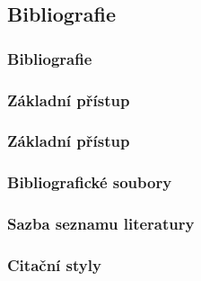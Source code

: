 \subsection{Bibliografie}
\begin{frame}
	\frametitle{Bibliografie}
	\UnderConstruction
\end{frame}


\subsubsection{Základní přístup}
\begin{frame}
	\frametitle{Základní přístup}
	\UnderConstruction
\end{frame}


\subsubsection{}
\begin{frame}
	\frametitle{\biblatex}
	\UnderConstruction
\end{frame}


\begin{frame}
	\frametitle{Bibliografické soubory}
	\UnderConstruction
\end{frame}


\begin{frame}
	\frametitle{Sazba seznamu literatury}
	\UnderConstruction
\end{frame}


\begin{frame}
	\frametitle{Citační styly}
	\UnderConstruction
\end{frame}


\subsubsection{}
\begin{frame}
	\frametitle{}
	\UnderConstruction
\end{frame}


\endinput